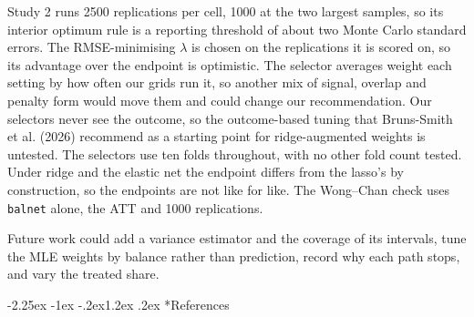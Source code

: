 \documentclass[
  12pt,
  a4paper,
]{article}
\makeatletter
\renewcommand\section{\@startsection{section}{1}{\z@}%
  {-2.25ex \@plus -1ex \@minus -.2ex}{1.2ex \@plus .2ex}%
  {\normalfont\Large\bfseries}}
\makeatother
\begin{document}
Study 2 runs 2500 replications per cell, 1000 at the two largest
samples, so its interior optimum rule is a reporting threshold of about
two Monte Carlo standard errors. The RMSE-minimising \(\lambda\) is
chosen on the replications it is scored on, so its advantage over the
endpoint is optimistic. The selector averages weight each setting by how
often our grids run it, so another mix of signal, overlap and penalty
form would move them and could change our recommendation. Our selectors
never see the outcome, so the outcome-based tuning that Bruns-Smith et
al. (2026) recommend as a starting point for ridge-augmented weights is
untested. The selectors use ten folds throughout, with no other fold
count tested. Under ridge and the elastic net the endpoint differs from
the lasso's by construction, so the endpoints are not like for like. The
Wong--Chan check uses \texttt{balnet} alone, the ATT and 1000
replications.

Future work could add a variance estimator and the coverage of its
intervals, tune the MLE weights by balance rather than prediction,
record why each path stops, and vary the treated share.

\section*{References}\label{references}
\end{document}
